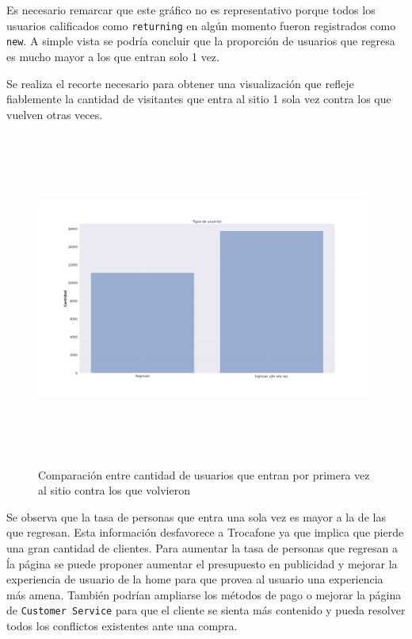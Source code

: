 \documentclass[a4paper]{article}
\begin{document}
Es necesario remarcar que este gráfico no es representativo porque todos los usuarios calificados como \texttt{returning} en algún momento fueron registrados como \texttt{new}. A simple vista se podría concluir que la proporción de usuarios que regresa es mucho mayor a los que entran solo 1 vez. 

Se realiza el recorte necesario para obtener una visualización que refleje fiablemente la cantidad de visitantes que entra al sitio 1 sola vez contra los que vuelven otras veces. 

\begin{figure}[h!]
	\includegraphics[width=11cm,height=11cm,keepaspectratio]{figures/131-tipos_usuarios-barplot.png}
	\caption{Comparación entre cantidad de usuarios que entran por primera vez al sitio contra los que volvieron}
	\label{newvsreturning}
\end{figure}

Se observa que la tasa de personas que entra una sola vez es mayor a la de las que regresan. Esta información desfavorece a Trocafone ya que implica que pierde una gran cantidad de clientes. Para aumentar la tasa de personas que regresan a ĺa página se puede proponer aumentar el presupuesto en publicidad y mejorar la experiencia de usuario de la home para que provea al usuario una experiencia más amena. También podrían ampliarse los métodos de pago o mejorar la página de \texttt{Customer Service} para que el cliente se sienta más contenido y pueda resolver todos los conflictos existentes ante una compra.
\end{document}
